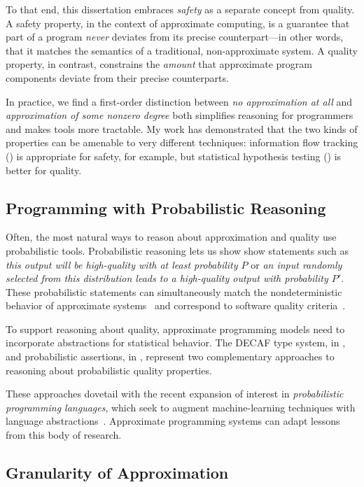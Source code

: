To that end, this dissertation embraces \emph{safety} as a separate concept
from quality.
A safety property, in the context of approximate computing, is a guarantee
that part of a program \emph{never} deviates from its precise counterpart---in
other words, that it matches the semantics of a traditional, non-approximate
system.
A quality property, in contrast, constrains the \emph{amount} that approximate
program components deviate from their precise counterparts.

In practice, we find a first-order distinction between \emph{no approximation at
all} and \emph{approximation of some nonzero degree} both simplifies reasoning
for programmers and makes tools more tractable.
My work has demonstrated that the two kinds of properties can be amenable to
very different techniques:
information flow tracking () is appropriate for safety, for
example, but statistical hypothesis testing () is better for
quality.

\subsection{Programming with Probabilistic Reasoning}

Often, the most natural ways to reason about approximation and quality use
probabilistic tools.
Probabilistic reasoning lets us show show statements such as \emph{this output
will be high-quality with at least probability $P$} or \emph{an input randomly
selected from this distribution leads to a high-quality output with
probability $P'$}.
These probabilistic statements can simultaneously match the nondeterministic behavior
of approximate systems~\cite{truffle, npu, approxstorage}
and correspond to software quality criteria~\cite{decaf, passert}.

To support reasoning about quality, approximate
programming models need to incorporate abstractions for statistical behavior.
The DECAF type system, in , and
probabilistic assertions, in , represent two
complementary approaches to reasoning about probabilistic quality
properties.

These approaches dovetail with the recent expansion of interest in
\emph{probabilistic programming languages}, which seek to augment
machine-learning techniques with language abstractions~\cite{church}.
Approximate programming systems can adapt lessons from this body of research.

\subsection{Granularity of Approximation}

